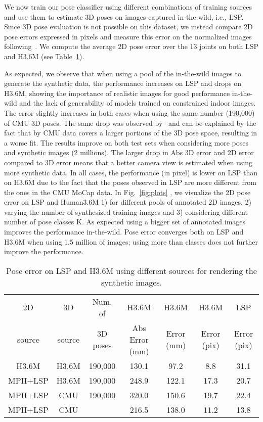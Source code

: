\documentclass{article}
\begin{document}
 

We now train our pose classifier using different combinations of
training sources and use them to estimate 3D poses on images captured
in-the-wild, i.e., LSP. Since 3D pose evaluation is not possible on
this dataset, we instead compare 2D pose errors expressed in
pixels and measure this error on the normalized  images following~\cite{ZhouZLDD16}. We compute the average 2D
pose error over the 13 joints on both LSP and H3.6M (see
Table~\ref{tab:LSPpix}).   


As expected, we observe that when using a pool of the in-the-wild
images to generate the synthetic data, the performance
increases on LSP and drops on H3.6M, showing the importance of
realistic images for good performance in-the-wild and the lack of
generability of models trained on constrained indoor images. The  error slightly
increases in both cases when using the same number (190,000) of CMU 3D
poses. The same drop was observed by~\cite{IqbalGG16} and can be
explained by the fact that by CMU data covers a larger portions of the
3D pose space, resulting in a worse fit. The results improve on both
test sets when considering more poses and synthetic images (2
millions). The larger drop in Abs 3D error and 2D error compared to 3D error means that a better 
camera view is estimated when using more synthetic data.
In all cases, the  performance (in pixel) is lower on LSP than on
H3.6M due to the fact that the poses observed in LSP are more
different from the ones in the CMU MoCap data. In Fig.~\ref{fig:plots}
, we visualize the 2D pose error on LSP and Human3.6M 1) for different
pools of annotated 2D images, 2) varying the number of synthesized
training images and 3) considering  different number of pose classes
K. As expected using a bigger set of annotated images improves the
performance in-the-wild. Pose error converges both on LSP and H3.6M
when using 1.5 million of images; using more than  classes does not further improve the performance.

  \begin{table} 
\caption{Pose error on LSP and H3.6M using different sources for rendering the synthetic images.}
\vspace{-2mm}\centering
\begin{tabular}{c|c|c|c|c|c|c}
2D   & 3D   & Num. of & H3.6M & H3.6M   & H3.6M   & LSP \\ 
       source &   source & 3D poses& Abs Error (mm)&   Error (mm) &    Error (pix) &   Error (pix)\\ 
\hline 
H3.6M   & H3.6M & 190,000 & 130.1&  97.2 &8.8&31.1 \\  
MPII+LSP   & H3.6M &190,000 &248.9& 122.1 &17.3&20.7   \\ 
MPII+LSP     & CMU & 190,000 &  320.0&150.6 &19.7&22.4  \\ 
MPII+LSP   & CMU &     & 216.5 & 138.0 & 11.2 & 13.8  \\ 
\end{tabular} 
\label{tab:LSPpix}
\end{table}
\end{document}
